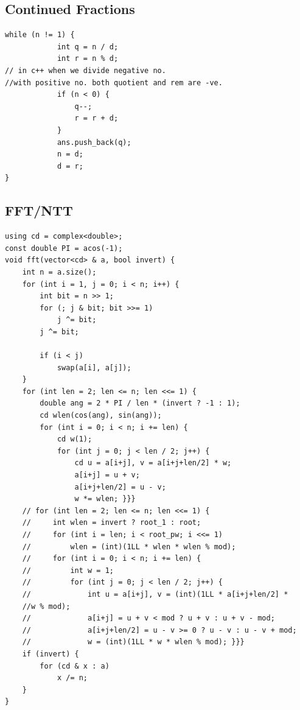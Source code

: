 \documentclass[8pt, a4paper, oneside, twocolumn]{extarticle}
\begin{document}
\subsection{Continued Fractions}
\begin{verbatim}
while (n != 1) {
            int q = n / d;
            int r = n % d;
// in c++ when we divide negative no. 
//with positive no. both quotient and rem are -ve.
            if (n < 0) {
                q--;
                r = r + d;
            }
            ans.push_back(q);
            n = d;
            d = r;
}
\end{verbatim}
\subsection{FFT/NTT}
\begin{verbatim}
using cd = complex<double>;
const double PI = acos(-1);
void fft(vector<cd> & a, bool invert) {
    int n = a.size();
    for (int i = 1, j = 0; i < n; i++) {
        int bit = n >> 1;
        for (; j & bit; bit >>= 1)
            j ^= bit;
        j ^= bit;

        if (i < j)
            swap(a[i], a[j]);
    }
    for (int len = 2; len <= n; len <<= 1) {
        double ang = 2 * PI / len * (invert ? -1 : 1);
        cd wlen(cos(ang), sin(ang));
        for (int i = 0; i < n; i += len) {
            cd w(1);
            for (int j = 0; j < len / 2; j++) {
                cd u = a[i+j], v = a[i+j+len/2] * w;
                a[i+j] = u + v;
                a[i+j+len/2] = u - v;
                w *= wlen; }}}
	// for (int len = 2; len <= n; len <<= 1) {
    //     int wlen = invert ? root_1 : root;
    //     for (int i = len; i < root_pw; i <<= 1)
    //         wlen = (int)(1LL * wlen * wlen % mod);
    //     for (int i = 0; i < n; i += len) {
    //         int w = 1;
    //         for (int j = 0; j < len / 2; j++) {
    //             int u = a[i+j], v = (int)(1LL * a[i+j+len/2] * 
    //w % mod);
    //             a[i+j] = u + v < mod ? u + v : u + v - mod;
    //             a[i+j+len/2] = u - v >= 0 ? u - v : u - v + mod;
    //             w = (int)(1LL * w * wlen % mod); }}}
    if (invert) {
        for (cd & x : a)
            x /= n;
    }
}
\end{verbatim}
\end{document}
